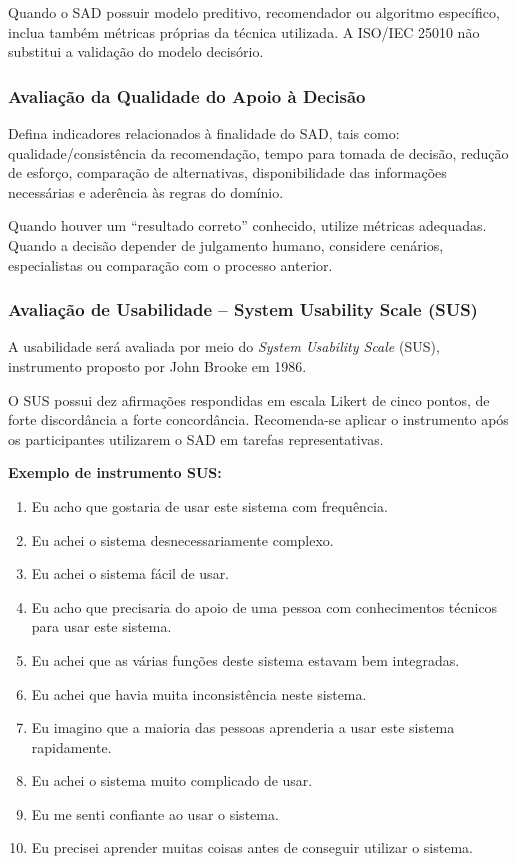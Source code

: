 \documentclass[12pt]{article}
\begin{document}
Quando o SAD possuir modelo preditivo, recomendador ou algoritmo específico, inclua também métricas próprias da técnica utilizada. A ISO/IEC 25010 não substitui a validação do modelo decisório.

\subsubsection{Avaliação da Qualidade do Apoio à Decisão}

Defina indicadores relacionados à finalidade do SAD, tais como:
qualidade/consistência da recomendação, tempo para tomada de decisão, redução de esforço, comparação de alternativas, disponibilidade das informações necessárias e aderência às regras do domínio.

Quando houver um ``resultado correto'' conhecido, utilize métricas adequadas. Quando a decisão depender de julgamento humano, considere cenários, especialistas ou comparação com o processo anterior.

\subsubsection{Avaliação de Usabilidade -- System Usability Scale (SUS)}

A usabilidade será avaliada por meio do \textit{System Usability Scale} (SUS), instrumento proposto por John Brooke em 1986.

O SUS possui dez afirmações respondidas em escala Likert de cinco pontos, de forte discordância a forte concordância. Recomenda-se aplicar o instrumento após os participantes utilizarem o SAD em tarefas representativas.

\textbf{Exemplo de instrumento SUS:}
\begin{enumerate}
    \item Eu acho que gostaria de usar este sistema com frequência.
    \item Eu achei o sistema desnecessariamente complexo.
    \item Eu achei o sistema fácil de usar.
    \item Eu acho que precisaria do apoio de uma pessoa com conhecimentos técnicos para usar este sistema.
    \item Eu achei que as várias funções deste sistema estavam bem integradas.
    \item Eu achei que havia muita inconsistência neste sistema.
    \item Eu imagino que a maioria das pessoas aprenderia a usar este sistema rapidamente.
    \item Eu achei o sistema muito complicado de usar.
    \item Eu me senti confiante ao usar o sistema.
    \item Eu precisei aprender muitas coisas antes de conseguir utilizar o sistema.
\end{enumerate}
\end{document}
